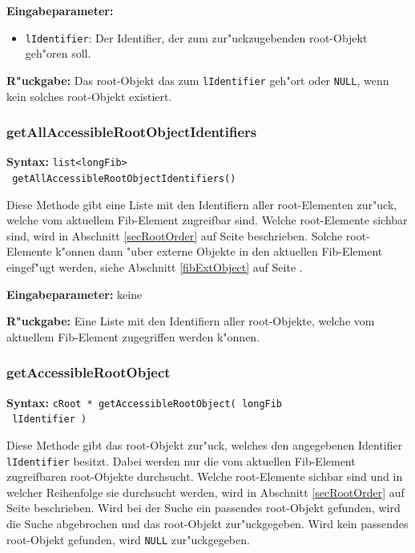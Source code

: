 \bigskip\noindent
\textbf{Eingabeparameter:}
\begin{itemize}
 \item \verb|lIdentifier|: Der Identifier, der zum zur"uckzugebenden root-Objekt geh"oren soll.
\end{itemize}

\bigskip\noindent
\textbf{R"uckgabe:} Das root-Objekt das zum \verb|lIdentifier| geh"ort oder \verb|NULL|, wenn kein solches root-Objekt existiert.


\subsubsection{getAllAccessibleRootObjectIdentifiers}

\textbf{Syntax:} \verb|list<longFib>| \\\verb| getAllAccessibleRootObjectIdentifiers()|

\bigskip\noindent
Diese Methode gibt eine Liste mit den Identifiern aller root-Elementen zur"uck, welche vom aktuellem Fib-Element zugreifbar sind. Welche root-Elemente sichbar sind, wird in Abschnitt \ref{secRootOrder} auf Seite \pageref{secRootOrder} beschrieben. Solche root-Elemente k"onnen dann "uber externe Objekte in den aktuellen Fib-Element eingef"ugt werden, siehe Abschnitt \ref{fibExtObject} auf Seite \pageref{fibExtObject} .

\bigskip\noindent
\textbf{Eingabeparameter:} keine

\bigskip\noindent
\textbf{R"uckgabe:} Eine Liste mit den Identifiern aller root-Objekte, welche vom aktuellem Fib-Element zugegriffen werden k"onnen.


\subsubsection{getAccessibleRootObject}

\textbf{Syntax:} \verb|cRoot * getAccessibleRootObject( longFib| \\\verb| lIdentifier )|

\bigskip\noindent
Diese Methode gibt das root-Objekt zur"uck, welches den angegebenen Identifier \verb|lIdentifier| besitzt. Dabei werden nur die vom aktuellen Fib-Element zugreifbaren root-Objekte durchsucht. Welche root-Elemente sichbar sind und in welcher Reihenfolge sie durchsucht werden, wird in Abschnitt \ref{secRootOrder} auf Seite \pageref{secRootOrder} beschrieben. Wird bei der Suche ein passendes root-Objekt gefunden, wird die Suche abgebrochen und das root-Objekt zur"uckgegeben. Wird kein passendes root-Objekt gefunden, wird \verb|NULL| zur"uckgegeben.

